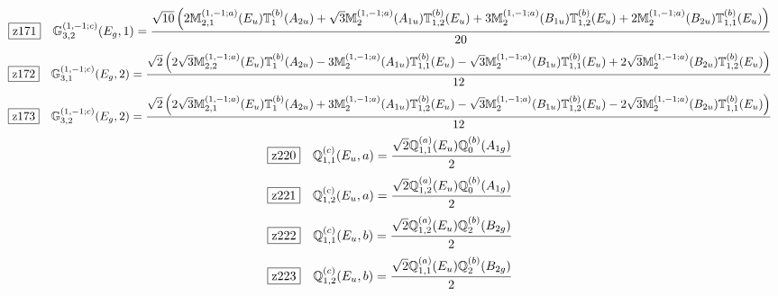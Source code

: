 \documentclass[fleqn,10pt,landscape]{jsarticle}
\begin{document}
\begin{dmath*}
\hspace*{3mm}\fbox{z171}\quad \mathbb{G}_{3,2}^{(1,-1;c)}(E_{g},1)=\frac{\sqrt{10} \left(2 \mathbb{M}_{2,1}^{(1,-1;a)}(E_{u}) \mathbb{T}_{1}^{(b)}(A_{2u}) + \sqrt{3} \mathbb{M}_{2}^{(1,-1;a)}(A_{1u}) \mathbb{T}_{1,2}^{(b)}(E_{u}) + 3 \mathbb{M}_{2}^{(1,-1;a)}(B_{1u}) \mathbb{T}_{1,2}^{(b)}(E_{u}) + 2 \mathbb{M}_{2}^{(1,-1;a)}(B_{2u}) \mathbb{T}_{1,1}^{(b)}(E_{u})\right)}{20}
\end{dmath*}
\begin{dmath*}
\hspace*{3mm}\fbox{z172}\quad \mathbb{G}_{3,1}^{(1,-1;c)}(E_{g},2)=\frac{\sqrt{2} \left(2 \sqrt{3} \mathbb{M}_{2,2}^{(1,-1;a)}(E_{u}) \mathbb{T}_{1}^{(b)}(A_{2u}) - 3 \mathbb{M}_{2}^{(1,-1;a)}(A_{1u}) \mathbb{T}_{1,1}^{(b)}(E_{u}) - \sqrt{3} \mathbb{M}_{2}^{(1,-1;a)}(B_{1u}) \mathbb{T}_{1,1}^{(b)}(E_{u}) + 2 \sqrt{3} \mathbb{M}_{2}^{(1,-1;a)}(B_{2u}) \mathbb{T}_{1,2}^{(b)}(E_{u})\right)}{12}
\end{dmath*}
\begin{dmath*}
\hspace*{3mm}\fbox{z173}\quad \mathbb{G}_{3,2}^{(1,-1;c)}(E_{g},2)=\frac{\sqrt{2} \left(2 \sqrt{3} \mathbb{M}_{2,1}^{(1,-1;a)}(E_{u}) \mathbb{T}_{1}^{(b)}(A_{2u}) + 3 \mathbb{M}_{2}^{(1,-1;a)}(A_{1u}) \mathbb{T}_{1,2}^{(b)}(E_{u}) - \sqrt{3} \mathbb{M}_{2}^{(1,-1;a)}(B_{1u}) \mathbb{T}_{1,2}^{(b)}(E_{u}) - 2 \sqrt{3} \mathbb{M}_{2}^{(1,-1;a)}(B_{2u}) \mathbb{T}_{1,1}^{(b)}(E_{u})\right)}{12}
\end{dmath*}
\begin{dmath*}
\hspace*{3mm}\fbox{z220}\quad \mathbb{Q}_{1,1}^{(c)}(E_{u},a)=\frac{\sqrt{2} \mathbb{Q}_{1,1}^{(a)}(E_{u}) \mathbb{Q}_{0}^{(b)}(A_{1g})}{2}
\end{dmath*}
\begin{dmath*}
\hspace*{3mm}\fbox{z221}\quad \mathbb{Q}_{1,2}^{(c)}(E_{u},a)=\frac{\sqrt{2} \mathbb{Q}_{1,2}^{(a)}(E_{u}) \mathbb{Q}_{0}^{(b)}(A_{1g})}{2}
\end{dmath*}
\begin{dmath*}
\hspace*{3mm}\fbox{z222}\quad \mathbb{Q}_{1,1}^{(c)}(E_{u},b)=\frac{\sqrt{2} \mathbb{Q}_{1,2}^{(a)}(E_{u}) \mathbb{Q}_{2}^{(b)}(B_{2g})}{2}
\end{dmath*}
\begin{dmath*}
\hspace*{3mm}\fbox{z223}\quad \mathbb{Q}_{1,2}^{(c)}(E_{u},b)=\frac{\sqrt{2} \mathbb{Q}_{1,1}^{(a)}(E_{u}) \mathbb{Q}_{2}^{(b)}(B_{2g})}{2}
\end{dmath*}
\end{document}
